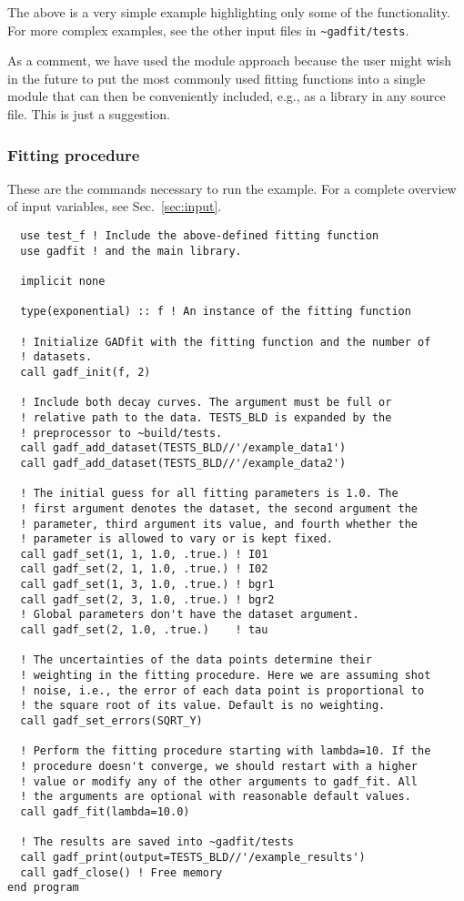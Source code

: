 \documentclass{article}
\begin{document}
The above is a very simple example highlighting only some of the functionality. For more complex examples, see the other input files in \verb+~gadfit/tests+.

As a comment, we have used the module approach because the user might wish in the future to put the most commonly used fitting functions into a single module that can then be conveniently included, e.g., as a library in any source file. This is just a suggestion.

\subsubsection{Fitting procedure}

These are the commands necessary to run the example. For a complete overview of input variables, see Sec.~\ref{sec:input}.
\begin{verbatim}
  use test_f ! Include the above-defined fitting function
  use gadfit ! and the main library.
  
  implicit none

  type(exponential) :: f ! An instance of the fitting function

  ! Initialize GADfit with the fitting function and the number of
  ! datasets.
  call gadf_init(f, 2)

  ! Include both decay curves. The argument must be full or
  ! relative path to the data. TESTS_BLD is expanded by the
  ! preprocessor to ~build/tests.
  call gadf_add_dataset(TESTS_BLD//'/example_data1')
  call gadf_add_dataset(TESTS_BLD//'/example_data2')

  ! The initial guess for all fitting parameters is 1.0. The
  ! first argument denotes the dataset, the second argument the
  ! parameter, third argument its value, and fourth whether the
  ! parameter is allowed to vary or is kept fixed.
  call gadf_set(1, 1, 1.0, .true.) ! I01
  call gadf_set(2, 1, 1.0, .true.) ! I02
  call gadf_set(1, 3, 1.0, .true.) ! bgr1
  call gadf_set(2, 3, 1.0, .true.) ! bgr2
  ! Global parameters don't have the dataset argument.
  call gadf_set(2, 1.0, .true.)    ! tau

  ! The uncertainties of the data points determine their
  ! weighting in the fitting procedure. Here we are assuming shot
  ! noise, i.e., the error of each data point is proportional to
  ! the square root of its value. Default is no weighting.
  call gadf_set_errors(SQRT_Y)

  ! Perform the fitting procedure starting with lambda=10. If the
  ! procedure doesn't converge, we should restart with a higher
  ! value or modify any of the other arguments to gadf_fit. All
  ! the arguments are optional with reasonable default values.
  call gadf_fit(lambda=10.0)

  ! The results are saved into ~gadfit/tests
  call gadf_print(output=TESTS_BLD//'/example_results')
  call gadf_close() ! Free memory
end program
\end{verbatim}
\end{document}
